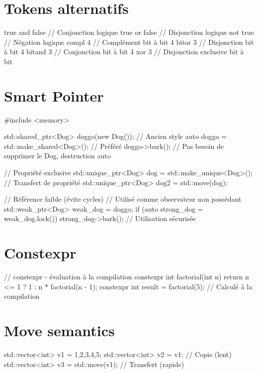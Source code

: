 \documentclass{article}
\begin{document}
\begin{multicols*}{4}
\section*{Tokens alternatifs}
\begin{cppcode}
true and false     // Conjonction logique
true or false      // Disjonction logique
not true           // Négation logique
compl 4            // Complément bit à bit
4 bitor 3          // Disjonction bit à bit
4 bitand 3         // Conjonction bit à bit
4 xor 3            // Disjonction exclusive bit à bit
\end{cppcode}

\section*{Smart Pointer}
\begin{cppcode}
#include <memory>

std::shared_ptr<Dog> doggo(new Dog()); // Ancien style
auto doggo = std::make_shared<Dog>();  // Préféré
doggo->bark();
// Pas besoin de supprimer le Dog, destruction auto

// Propriété exclusive
std::unique_ptr<Dog> dog = std::make_unique<Dog>();
// Transfert de propriété
std::unique_ptr<Dog> dog2 = std::move(dog);

// Référence faible (évite cycles)
// Utilisé comme observateur non possédant
std::weak_ptr<Dog> weak_dog = doggo;
if (auto strong_dog = weak_dog.lock()) {
    strong_dog->bark(); // Utilisation sécurisée
}
\end{cppcode}

\section*{Constexpr}
\begin{cppcode}
    // constexpr - évaluation à la compilation
constexpr int factorial(int n) {
    return n <= 1 ? 1 : n * factorial(n - 1);
}
constexpr int result = factorial(5); // Calculé à la compilation
\end{cppcode}

\section*{Move semantics}

\begin{cppcode}
std::vector<int> v1 = {1,2,3,4,5};
std::vector<int> v2 = v1; // Copie (lent)
std::vector<int> v3 = std::move(v1); // Transfert (rapide)


\end{cppcode}
\end{multicols*}
\end{document}
